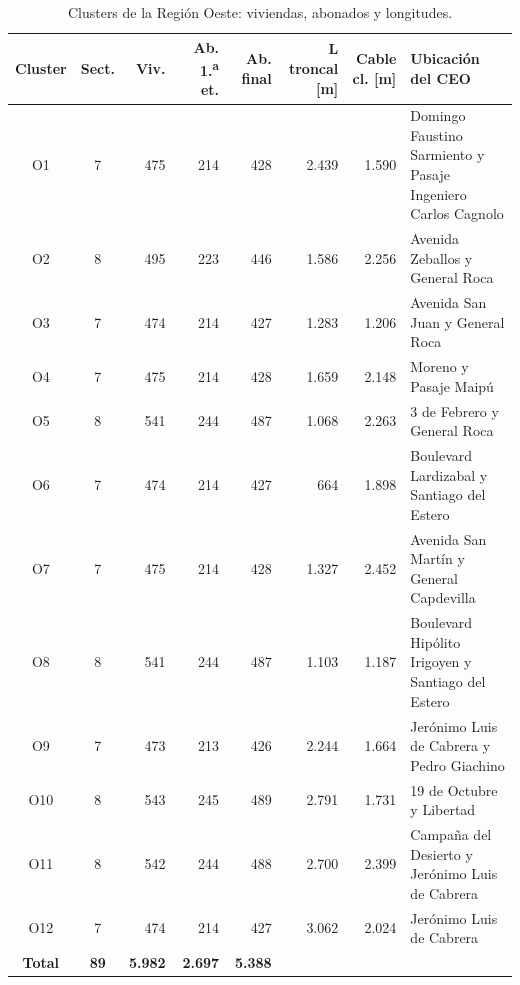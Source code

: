 \begin{table}[H]\centering\footnotesize
\caption{Clusters de la Región Oeste: viviendas, abonados y longitudes.}\label{tab:clusters_O}
\setlength{\tabcolsep}{3pt}\begin{tabular}{|c|c|r|r|r|r|r|p{3.6cm}|}\hline \textbf{Cluster} & \textbf{Sect.} & \textbf{Viv.} & \textbf{Ab. 1.\textsuperscript{a} et.} & \textbf{Ab. final} & \textbf{L troncal [m]} & \textbf{Cable cl. [m]} & \textbf{Ubicación del CEO} \\ \hline
O1 & 7 & 475 & 214 & 428 & 2.439 & 1.590 & Domingo Faustino Sarmiento y Pasaje Ingeniero Carlos Cagnolo \\ \hline
O2 & 8 & 495 & 223 & 446 & 1.586 & 2.256 & Avenida Zeballos y General Roca \\ \hline
O3 & 7 & 474 & 214 & 427 & 1.283 & 1.206 & Avenida San Juan y General Roca \\ \hline
O4 & 7 & 475 & 214 & 428 & 1.659 & 2.148 & Moreno y Pasaje Maipú \\ \hline
O5 & 8 & 541 & 244 & 487 & 1.068 & 2.263 & 3 de Febrero y General Roca \\ \hline
O6 & 7 & 474 & 214 & 427 & 664 & 1.898 & Boulevard Lardizabal y Santiago del Estero \\ \hline
O7 & 7 & 475 & 214 & 428 & 1.327 & 2.452 & Avenida San Martín y General Capdevilla \\ \hline
O8 & 8 & 541 & 244 & 487 & 1.103 & 1.187 & Boulevard Hipólito Irigoyen y Santiago del Estero \\ \hline
O9 & 7 & 473 & 213 & 426 & 2.244 & 1.664 & Jerónimo Luis de Cabrera y Pedro Giachino \\ \hline
O10 & 8 & 543 & 245 & 489 & 2.791 & 1.731 & 19 de Octubre y Libertad \\ \hline
O11 & 8 & 542 & 244 & 488 & 2.700 & 2.399 & Campaña del Desierto y Jerónimo Luis de Cabrera \\ \hline
O12 & 7 & 474 & 214 & 427 & 3.062 & 2.024 & Jerónimo Luis de Cabrera \\ \hline
\textbf{Total} & \textbf{89} & \textbf{5.982} & \textbf{2.697} & \textbf{5.388} & \multicolumn{3}{l|}{} \\ \hline
\end{tabular}\end{table}
